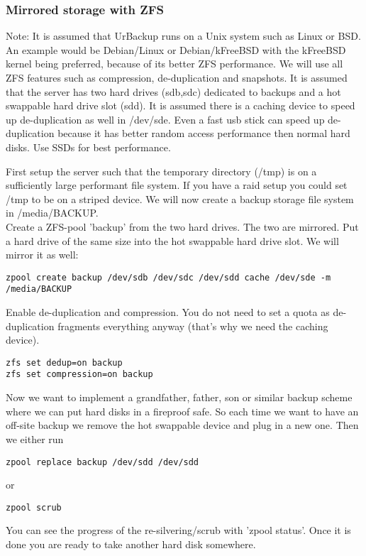 \documentclass[a4paper,10pt]{article}
\begin{document}
\subsubsection{Mirrored storage with ZFS}
\label{subsec_ZFS_setup}

Note: It is assumed that UrBackup runs on a Unix system such as Linux or BSD. An example would be Debian/Linux or Debian/kFreeBSD with the kFreeBSD kernel being preferred, because of its better ZFS performance. We will use all ZFS features such as compression, de-duplication and snapshots. It is assumed that the server has two hard drives (sdb,sdc) dedicated to backups and a hot swappable hard drive slot (sdd). It is assumed there is a caching device to speed up de-duplication as well in /dev/sde. Even a fast usb stick can speed up de-duplication because it has better random access performance then normal hard disks. Use SSDs for best performance. 

First setup the server such that the temporary directory (/tmp) is on a sufficiently large performant file system. If you have a raid setup you could set /tmp to be on a striped device. We will now create a backup storage file system in /media/BACKUP.\\
Create a ZFS-pool 'backup' from the two hard drives. The two are mirrored. Put a hard drive of the same size into the hot swappable hard drive slot. We will mirror it as well:
\begin{verbatim}
zpool create backup /dev/sdb /dev/sdc /dev/sdd cache /dev/sde -m /media/BACKUP
\end{verbatim}
Enable de-duplication and compression. You do not need to set a quota as de-duplication fragments everything anyway (that's why we need the caching device).
\begin{verbatim}
zfs set dedup=on backup
zfs set compression=on backup
\end{verbatim}
Now we want to implement a grandfather, father, son or similar backup scheme where we can put hard disks in a fireproof safe. So each time we want to have an off-site backup we remove the hot swappable device and plug in a new one. Then we either run
\begin{verbatim}
zpool replace backup /dev/sdd /dev/sdd
\end{verbatim}
or
\begin{verbatim}
zpool scrub
\end{verbatim}
You can see the progress of the re-silvering/scrub with 'zpool status'. Once it is done you are ready to take another hard disk somewhere.
\end{document}
